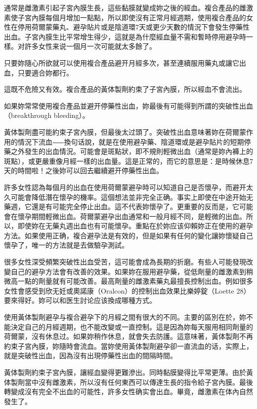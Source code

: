 \documentclass[12pt,UTF8]{ctexbook}
\begin{document}
通常是雌激素引起子宮內膜生長，這些黏膜就變成妳之後的經血。複合產品的雌激素使子宮內膜每個月增加一點點，所以即使沒有正常月經週期，使用複合產品的女性在停用荷爾蒙藥丸、避孕貼片或是陰道環7天或更少天數的情況下會發生停藥性出血。子宮內膜生比平常增生得少，這就是為什麼經血量不需和暫時停用避孕時一樣。对許多女性来说一個月一次可能就太多餘了。

只要妳隨心所欲就可以使用複合產品避开月經多次，甚至連續服用藥丸或讓它出血，只要適合妳都行。

這既不危險又有效。複合產品的黃体製劑約束了子宮內膜，所以經血不會流出。

如果妳常常使用複合產品並避开停藥性出血，妳最後有可能得到所謂的突破性出血（breakthrough bleeding）。

黃体製劑盡可能約束子宮內膜，但最後太过頭了。突破性出血意味著妳在荷爾蒙作用的情況下流血⸺換句话說，就是在使用避孕藥、陰道環或是避孕貼片的短期停藥之外發生的出血情況。可能會是斑點狀，即不規則輕微出血（通常是妳內褲上的斑點），或更嚴重像月經一樣的出血量。這是正常的，而它的意思是：是時候休息7天的時間啦！之後妳可以回去繼續避开停藥性出血。

許多女性認為每個月的出血在使用荷爾蒙避孕時可以知道自己是否懷孕，而避开太久可能會降低潛在懷孕的機率。這個想法並非完全正确。事实上即使在中途开始无藥週，它還是有可能完全停止出血。這不代表妳懷孕了。更重要的反而是，它可能會在懷孕期間輕微出血。荷爾蒙避孕出血通常和一般月經不同，是輕微的出血。所以，即使妳在无藥丸週出血也有可能懷孕。重點在於妳应该仰賴妳正在使用的避孕方法。如果使用正确，複合避孕法是有效的，但是如果有任何的變化讓妳懷疑自己懷孕了，唯一的方法就是去做驗孕測試。

很多女性深受頻繁突破性出血受苦，這可能會成為長期的折磨。有些人可能發現改變自己的避孕方法會有改善的效果。如果妳在服用避孕藥，從低劑量的雌激素到稍微高一點的劑量就有可能改善。最高劑量的雌激素藥丸最擅長控制出血。例如很多女性會感受到欣无妊或奧諾康（Oralcon）的控制出血效果比樂婷錠（Loette 28）要來得好。妳可以和医生討论应该換成哪種方式。

使用黃体製劑避孕与複合避孕下的月經之間有很大的不同。主要的區別在於，妳不能決定自己的月經週期，也不能改變或一直控制。這是因為妳每天服用相同劑量的荷爾蒙，沒有休息过。如果妳稍作休息，就會失去防護。這意味著，黃体製劑不再約束子宮內膜，妳隨時會流血。當妳使用黃体製劑避孕卻一直流血的话，实際上，就是突破性出血，因為沒有出現停藥性出血的間隔時間。

黃体製劑約束子宮內膜，讓經血變得更難滲出。同時黏膜變得比平常更薄。由於黃体製劑當中沒有雌激素，所以沒有任何東西可以傳達生長的指令給子宮內膜。最後轉變成沒有完全不出血的可能性，許多女性确实會出血。畢竟，雌激素在体內自然發生了。
\end{document}
